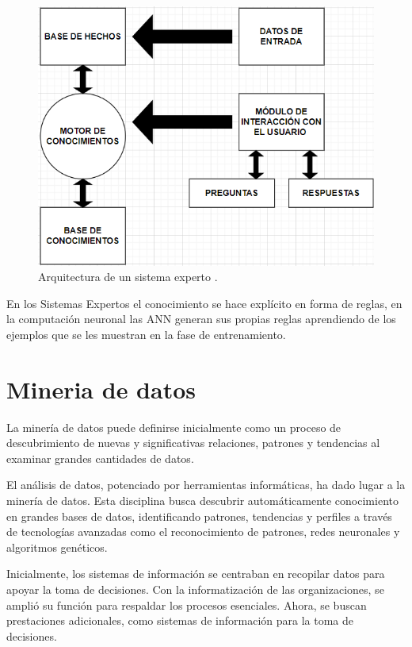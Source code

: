 \begin{figure}[H]
  \begin{center}
    \includegraphics[scale=0.50]{./hechos.png}
    \caption{Arquitectura de un sistema experto \cite{diez2001introduccion}.}
    \label{fig:Arquitectura de un sistema experto}
  \end{center}
\end{figure}




En los Sistemas Expertos el conocimiento se hace explícito en forma de reglas, en la computación neuronal las ANN generan sus propias reglas aprendiendo de los ejemplos que se les muestran en la fase de entrenamiento\cite{olabe1998redes}. 



\section{Mineria de datos}
La minería de datos puede definirse inicialmente como un proceso de descubrimiento de nuevas y significativas relaciones, patrones y tendencias al examinar grandes cantidades de datos\cite{perez2007mineria}.

El análisis de datos, potenciado por herramientas informáticas, ha dado lugar a la minería de datos. Esta disciplina busca descubrir automáticamente conocimiento en grandes bases de datos, identificando patrones, tendencias y perfiles a través de tecnologías avanzadas como el reconocimiento de patrones, redes neuronales y algoritmos genéticos.

Inicialmente, los sistemas de información se centraban en recopilar datos para apoyar la toma de decisiones. Con la informatización de las organizaciones, se amplió su función para respaldar los procesos esenciales. Ahora, se buscan prestaciones adicionales, como sistemas de información para la toma de decisiones.


